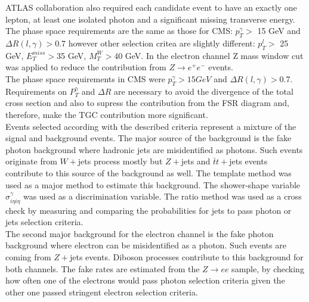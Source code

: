 ATLAS collaboration also required each candidate event to have an exactly one lepton, at least one isolated photon and a significant missing transverse energy. The phase space requirements are the same as those for CMS: $p_T^{\gamma}>$ 15 GeV and $\Delta R(l,\gamma)>$0.7 however other selection critea are slightly different: $p_T^l>$ 25 GeV, $E_T^{miss}>$35 GeV, $M_T^W>40$ GeV. In the electron channel Z mass window cut was applied to reduce the contribution from $Z\rightarrow e^+e^-$ events.\\

The phase space requirements in CMS were $p_T^\gamma>15 GeV$ and  $\Delta R(l,\gamma)>$0.7. Requirements on $P_T^\gamma$ and $\Delta R$ are necessary to avoid the divergence of the total cross section and also to supress the contribution from the FSR diagram and, therefore, make the TGC contribution more significant.\\








Events selected according with the described criteria represent a mixture of the signal and background events. The major source of the background is the fake photon background where hadronic jets are misidentified as photons. Such events originate from $W+$jets process mostly but $Z+$jets and $\bar{t}t+$jets events contribute to this source of the background as well. The template method was used as a major method to estimate this background. The shower-shape variable $\sigma_{i\eta i\eta}^{\gamma}$ was used as a discrimination variable. The ratio method was used as a cross check by measuring and comparing the probabilities for jets to pass photon or jets selection criteria. \\

The second major background for the electron channel is the fake photon background where electron can be misidentified as a photon. Such events are coming from $Z+$jets events. Diboson processes contribute to this background for both channels. The fake rates are estimated from the $Z\rightarrow ee$ sample, by checking how often one of the electrons would pass photon selection criteria given the other one passed stringent electron selection criteria.\\

